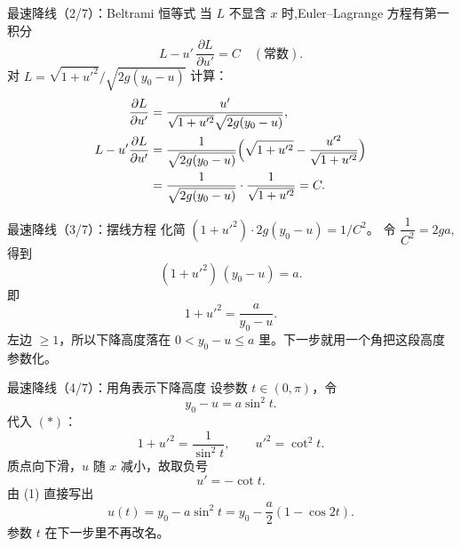 \documentclass[fontset=windows, chinese, 10pt, xcolor=dvipsnames]{beamer}
\begin{document}
\begin{frame}{最速降线（2/7）：Beltrami 恒等式}
  当 $L$ 不显含 $x$ 时,Euler--Lagrange 方程有第一积分
  \begin{equation*}
    L - u'\,\frac{\partial L}{\partial u'} = C \quad(\text{常数}).
  \end{equation*}
  对 $L=\sqrt{1+u'^2}/\sqrt{2g(y_0-u)}$ 计算：
  \begin{align*}
    \frac{\partial L}{\partial u'}
    &= \frac{u'}{\sqrt{1+u'^2}\sqrt{2g(y_0-u)}}, \\
    L - u'\frac{\partial L}{\partial u'}
    &= \frac{1}{\sqrt{2g(y_0-u)}}
       \Bigl(\sqrt{1+u'^2}
            - \frac{u'^2}{\sqrt{1+u'^2}}\Bigr) \\
    &= \frac{1}{\sqrt{2g(y_0-u)}}\cdot
       \frac{1}{\sqrt{1+u'^2}} = C.
  \end{align*}
\end{frame}

\begin{frame}{最速降线（3/7）：摆线方程}
  化简 $(1+u'^2)\cdot 2g(y_0-u) = 1/C^2$。
  令 $\dfrac{1}{C^2} = 2ga$,得到
  \begin{equation*}
    (1+u'^2)\,(y_0-u) = a. \tag{$\ast$}
  \end{equation*}
  即
  \begin{equation*}
    1+u'^2=\frac{a}{y_0-u}.
  \end{equation*}
  左边 $\ge 1$，所以下降高度落在
  $0<y_0-u\le a$ 里。下一步就用一个角把这段高度参数化。
\end{frame}

\begin{frame}{最速降线（4/7）：用角表示下降高度}
  设参数 $t\in(0,\pi)$，令
  \begin{equation*}
    y_0-u=a\sin^2 t. \tag{1}
  \end{equation*}
  代入 $(\ast)$：
  \begin{equation*}
    1+u'^2=\frac{1}{\sin^2 t},
    \qquad
    u'^2=\cot^2 t.
  \end{equation*}
  质点向下滑，$u$ 随 $x$ 减小，故取负号
  \begin{equation*}
    u'=-\cot t. \tag{2}
  \end{equation*}
  由 (1) 直接写出
  \begin{equation*}
    u(t)=y_0-a\sin^2 t
        =y_0-\frac{a}{2}(1-\cos 2t).
  \end{equation*}
  参数 $t$ 在下一步里不再改名。
\end{frame}
\end{document}
